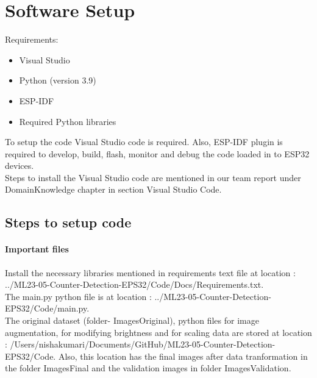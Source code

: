\section{Software Setup}
Requirements:
\begin{itemize}
	\item Visual Studio
	\item Python (version 3.9)
	\item ESP-IDF
	\item Required Python libraries
\end{itemize}

To setup the code Visual Studio code is required. Also, ESP-IDF plugin is required to develop, build, flash, monitor and debug the code loaded in to ESP32 devices.\\

Steps to install the Visual Studio code are mentioned in our team report under DomainKnowledge chapter in section Visual Studio Code.

\subsection{Steps to setup code}
\paragraph{Important files}
Install the necessary libraries mentioned in requirements text file at location :  ../ML23-05-Counter-Detection-EPS32/Code/Docs/Requirements.txt.\\

The main.py python file is at location : ../ML23-05-Counter-Detection-EPS32/Code/main.py.\\

The original dataset (folder- ImagesOriginal), python files for image augmentation, for modifying brightness and for scaling data are stored at location : /Users/nishakumari/Documents/GitHub/ML23-05-Counter-Detection-EPS32/Code. Also, this location has the final images after data tranformation in the folder ImagesFinal and the validation images in folder ImagesValidation.\\

